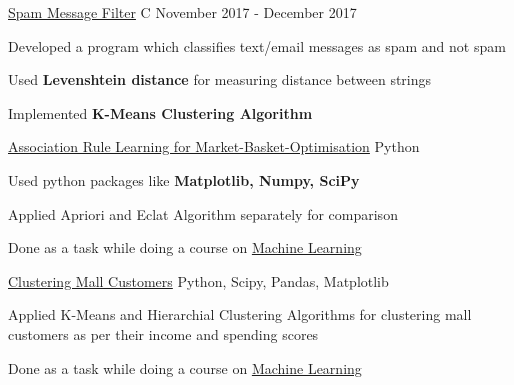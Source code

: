 \begin{cventries}
\projects
{} %
 {\href{https://github.com/parthgoyal123/Queen-McCluskey}{Spam Message Filter}} %
 {C} %
 {November 2017 - December 2017} %
 {
   \begin{cvitems} %
     \item {Developed a program which classifies text/email messages as spam and not spam}
     \item {Used \textbf{Levenshtein distance} for measuring distance between strings} 
     \item {Implemented \textbf{K-Means Clustering Algorithm}}
   \end{cvitems}
 }
  
    \projects
    {} %
    {\href{https://github.com/parthgoyal123/Machine-Learning-Templates/blob/master/5.%20Association%20Rule%20Learning/Market_Basket_Optimisation.csv}{Association Rule Learning for Market-Basket-Optimisation}} %
    {Python} %
    {} %
    {
      \begin{cvitems} %
        \item {Used python packages like \textbf{Matplotlib, Numpy, SciPy}}
        \item {Applied Apriori and Eclat Algorithm separately for comparison}
        \item {Done as a task while doing a course on \href{https://www.udemy.com/machinelearning/learn/lecture/5846946?start=0#overview}{Machine Learning}}
      \end{cvitems}
    }



\projects
   {} %
    {\href{https://github.com/parthgoyal123/Machine-Learning-Templates/tree/master/4.%20Clustering}{Clustering Mall Customers}} %
    {Python, Scipy, Pandas, Matplotlib} %
    {} %
    {
      \begin{cvitems} %
        \item {Applied K-Means and Hierarchial Clustering Algorithms for clustering mall customers as per their income and spending scores}
        \item {Done as a task while doing a course on \href{https://www.udemy.com/machinelearning/learn/lecture/5846946?start=0#overview}{Machine Learning}}
      \end{cvitems}
    }
  

\end{cventries}
